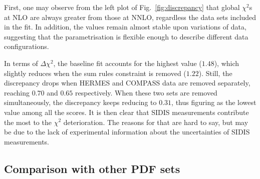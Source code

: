 First, one may observe from the left plot of Fig.~\ref{fig:discrepancy} that global $\chi^2$s at NLO are always greater from those at NNLO, regardless the data sets included in the fit. In addition, the values remain almost stable upon variations of data, suggesting that the parametrisation is flexible enough to describe different data configurations.%

In terms of $\Delta \chi^2$, the baseline fit accounts for the highest value ($1.48$), which slightly reduces when the sum rules constraint is removed ($1.22$). Still, the discrepancy drops when HERMES and COMPASS data are removed separately, reaching $0.70$ and $0.65$ respectively. When these two sets are removed simultaneously, the discrepancy keeps reducing to $0.31$, thus figuring as the lowest value among all the scores. It is then clear that SIDIS measurements contribute the most to the $\chi^2$ deterioration. The reasons for that are hard to say, but may be due to the lack of experimental information about the uncertainties of SIDIS measurements.

\subsection{Comparison with other PDF sets}

